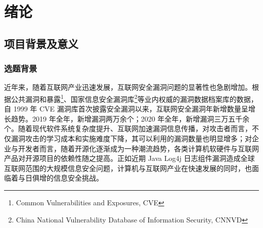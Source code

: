 \documentclass[a4paper,AutoFakeBold,oneside,12pt]{book}
\begin{document}
\blankmatter


% 

% 

% 

\frontmatter\tableofcontents %


\newpage\mainmatter
{}

\sloppy

\chapter{绪论}

\section{项目背景及意义}

\subsection{选题背景}

近年来，随着互联网产业迅速发展，互联网安全漏洞问题的显著性也急剧增加。根据公共漏洞和暴露\footnote{Common Vulnerabilities and Exposures, CVE}、国家信息安全漏洞库\footnote{China National Vulnerability Database of Information Security, CNNVD}等业内权威的漏洞数据档案库的数据\cite{download_cve_list}\cite{nvd_cpe_statistics}，自 1999 年 CVE 漏洞库首次披露安全漏洞以来，互联网安全漏洞年新增数量呈增长趋势。2019 年全年，新增漏洞两万余个；2020 年全年，新增漏洞三万五千余个。随着现代软件系统复杂度提升、互联网加速漏洞信息传播，对攻击者而言，不仅漏洞攻击的学习成本和实施难度下降，其可以利用的漏洞数量也明显增多\cite{vuldb_stats}；对企业与开发者而言，随着开源化逐渐成为一种潮流趋势，各类计算机软硬件与互联网产品对开源项目的依赖性随之提高。正如近期 Java Log4j 日志组件漏洞造成全球互联网范围的大规模信息安全问题，计算机与互联网产业在快速发展的同时，也面临着与日俱增的信息安全挑战。
\end{document}
